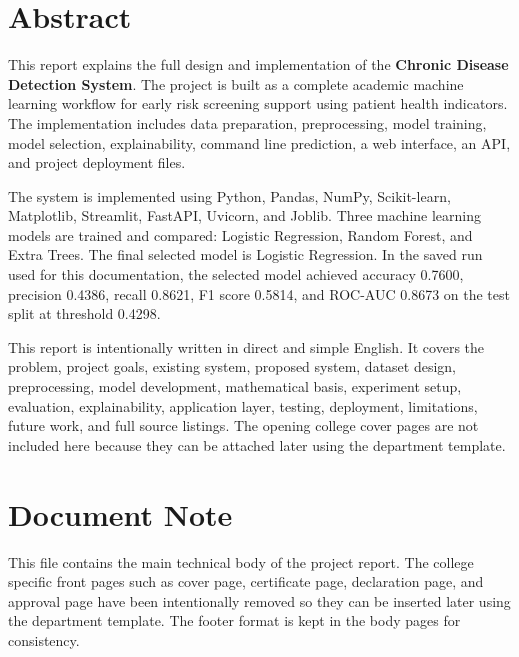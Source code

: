 \documentclass[12pt,a4paper,openany]{report}
\begin{document}

    \chapter*{Abstract}
    This report explains the full design and implementation of the \textbf{Chronic Disease Detection System}. The project is built as a complete academic machine learning workflow for early risk screening support using patient health indicators. The implementation includes data preparation, preprocessing, model training, model selection, explainability, command line prediction, a web interface, an API, and project deployment files.

    The system is implemented using Python, Pandas, NumPy, Scikit-learn, Matplotlib, Streamlit, FastAPI, Uvicorn, and Joblib. Three machine learning models are trained and compared: Logistic Regression, Random Forest, and Extra Trees. The final selected model is Logistic Regression. In the saved run used for this documentation, the selected model achieved accuracy 0.7600, precision 0.4386, recall 0.8621, F1 score 0.5814, and ROC-AUC 0.8673 on the test split at threshold 0.4298.

    This report is intentionally written in direct and simple English. It covers the problem, project goals, existing system, proposed system, dataset design, preprocessing, model development, mathematical basis, experiment setup, evaluation, explainability, application layer, testing, deployment, limitations, future work, and full source listings. The opening college cover pages are not included here because they can be attached later using the department template.

    \chapter*{Document Note}
    This file contains the main technical body of the project report. The college specific front pages such as cover page, certificate page, declaration page, and approval page have been intentionally removed so they can be inserted later using the department template. The footer format is kept in the body pages for consistency.

    \tableofcontents
    \listoftables
    \listoffigures
    \lstlistoflistings
    \clearpage

\end{document}
